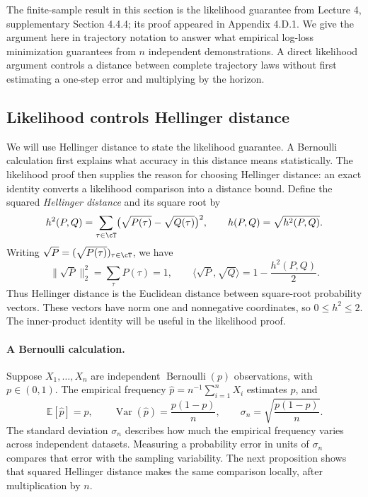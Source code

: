 \documentclass[11pt,twoside]{article}
\newcommand{\E}{\mathbb E}
\theoremstyle{definition}
\theoremstyle{remark}
\begin{document}
The finite-sample result in this section is the likelihood guarantee from
Lecture 4, supplementary Section 4.4.4; its proof appeared in Appendix 4.D.1.
We give the argument here in trajectory notation to answer what empirical
log-loss minimization guarantees from $n$ independent demonstrations.
A direct likelihood argument controls a
distance between complete trajectory laws without first estimating a
one-step error and multiplying by the horizon.

\subsection{Likelihood controls Hellinger distance}

We will use Hellinger distance to state the likelihood guarantee. A Bernoulli
calculation first explains what accuracy in this distance means statistically.
The likelihood proof then supplies the reason for choosing Hellinger distance:
an exact identity converts a likelihood comparison into a distance bound.
Define the squared \emph{Hellinger distance} and its square root by
\begin{equation}
 h^2(P,Q)=\sum_{\tau\in\cT}
       \bigl(\sqrt{P(\tau)}-\sqrt{Q(\tau)}\bigr)^2,\qquad
 h(P,Q)=\sqrt{h^2(P,Q)}.
 \label{eq:hellinger}
\end{equation}
Writing $\sqrt P=(\sqrt{P(\tau)})_{\tau\in\cT}$, we have
\[
 \|\sqrt P\|_2^2=\sum_\tau P(\tau)=1,\qquad
 \langle\sqrt P,\sqrt Q\rangle=1-\frac{h^2(P,Q)}2.
\]
Thus Hellinger distance is the Euclidean distance between square-root
probability vectors. These vectors have norm one and nonnegative
coordinates, so $0\le h^2\le2$. The inner-product identity will be useful
in the likelihood proof.

\paragraph{A Bernoulli calculation.}
Suppose $X_1,\ldots,X_n$ are independent $\operatorname{Bernoulli}(p)$
observations, with $p\in(0,1)$. The empirical frequency
$\widehat p=n^{-1}\sum_{i=1}^nX_i$ estimates $p$, and
\[
 \E[\widehat p]=p,\qquad
 \operatorname{Var}(\widehat p)=\frac{p(1-p)}n,\qquad
 \sigma_n=\sqrt{\frac{p(1-p)}n}.
\]
The standard deviation $\sigma_n$ describes how much the empirical frequency
varies across independent datasets. Measuring a probability error in units
of $\sigma_n$ compares that error with the sampling variability. The next
proposition shows that squared Hellinger distance makes the same comparison
locally, after multiplication by $n$.
\end{document}
